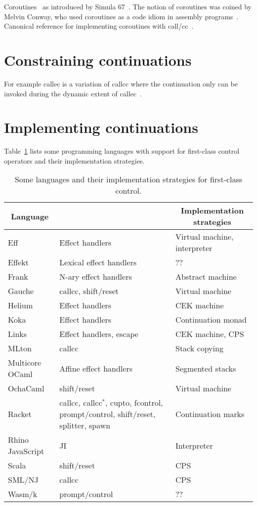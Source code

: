 \documentclass[12pt,phd,lfcs,twoside,openright,logo,leftchapter,normalheadings]{infthesis}
\theoremstyle{plain}
\theoremstyle{definition}
\begin{document}
Coroutines~\cite{DahlDH72} as introduced by Simula
67~\cite{DahlMN68}. The notion of coroutines was coined by Melvin
Conway, who used coroutines as a code idiom in assembly
programs~\cite{Knuth97}. Canonical reference for implementing
coroutines with call/cc~\cite{HaynesFW86}.

\section{Constraining continuations}
For example callec is a variation of callcc where the continuation
only can be invoked during the dynamic extent of
callec~\cite{Flatt20}.

\section{Implementing continuations}
Table~\ref{tbl:ctrl-operators-impls} lists some programming languages
with support for first-class control operators and their
implementation strategies.

\begin{table}
  \centering
  \begin{tabular}{| l | >{\raggedright}p{4.3cm} | l |}
    \hline
    \multicolumn{1}{|c|}{\textbf{Language}} & \multicolumn{1}{c |}{\textbf{Control operators}} & \multicolumn{1}{c|}{\textbf{Implementation strategies}}\\
    \hline
    Eff      & Effect handlers & Virtual machine, interpreter \\
    \hline
    Effekt   & Lexical effect handlers & ??\\
    \hline
    Frank    & N-ary effect handlers & Abstract machine \\
    \hline
    Gauche   & callcc, shift/reset & Virtual machine \\
    \hline
    Helium   & Effect handlers & CEK machine \\
    \hline
    Koka     & Effect handlers & Continuation monad\\
    \hline
    Links    & Effect handlers, escape & CEK machine, CPS\\
    \hline
    MLton    & callcc & Stack copying\\
    \hline
    Multicore OCaml  & Affine effect handlers & Segmented stacks\\
    \hline
    OchaCaml & shift/reset & Virtual machine\\
    \hline
    Racket & callcc, callcc$^{\ast}$, cupto, fcontrol, prompt/control, shift/reset, splitter, spawn & Continuation marks\\
    \hline
    Rhino JavaScript      & JI                & Interpreter \\
    \hline
    Scala                 & shift/reset       & CPS\\
    \hline
    SML/NJ                & callcc            & CPS\\
    \hline
    Wasm/k                & prompt/control    & ?? \\
    \hline
  \end{tabular}
  \caption{Some languages and  their implementation strategies for first-class control.}\label{tbl:ctrl-operators-impls}
\end{table}
\end{document}
